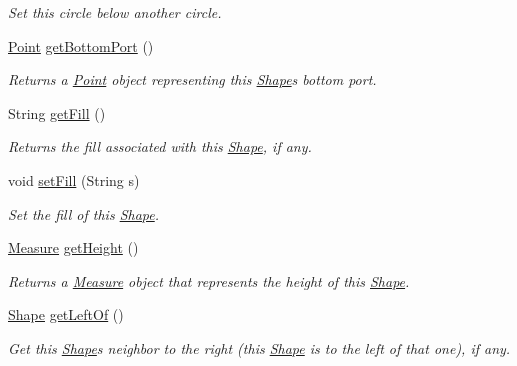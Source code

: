 \begin{DoxyCompactItemize}
\begin{DoxyCompactList}\small\item\em Set this circle below another circle. \end{DoxyCompactList}\item 
\hyperlink{classcom_1_1aarrelaakso_1_1drawl_1_1_point}{Point} \hyperlink{classcom_1_1aarrelaakso_1_1drawl_1_1_shape_aba14efe9a16c0808580963c66b171082}{get\+Bottom\+Port} ()
\begin{DoxyCompactList}\small\item\em Returns a \hyperlink{classcom_1_1aarrelaakso_1_1drawl_1_1_point}{Point} object representing this \hyperlink{classcom_1_1aarrelaakso_1_1drawl_1_1_shape}{Shape}\textquotesingle{}s bottom port. \end{DoxyCompactList}\item 
String \hyperlink{classcom_1_1aarrelaakso_1_1drawl_1_1_shape_a0d9a33a3e151aaceeec140bea343a650}{get\+Fill} ()
\begin{DoxyCompactList}\small\item\em Returns the fill associated with this \hyperlink{classcom_1_1aarrelaakso_1_1drawl_1_1_shape}{Shape}, if any. \end{DoxyCompactList}\item 
void \hyperlink{classcom_1_1aarrelaakso_1_1drawl_1_1_shape_a2a2868c85bfbf4d2940d929950001b3d}{set\+Fill} (String s)
\begin{DoxyCompactList}\small\item\em Set the fill of this \hyperlink{classcom_1_1aarrelaakso_1_1drawl_1_1_shape}{Shape}. \end{DoxyCompactList}\item 
\hyperlink{classcom_1_1aarrelaakso_1_1drawl_1_1_measure}{Measure} \hyperlink{classcom_1_1aarrelaakso_1_1drawl_1_1_shape_ac9f74d31c332aab76b329edc22080e67}{get\+Height} ()
\begin{DoxyCompactList}\small\item\em Returns a \hyperlink{classcom_1_1aarrelaakso_1_1drawl_1_1_measure}{Measure} object that represents the height of this \hyperlink{classcom_1_1aarrelaakso_1_1drawl_1_1_shape}{Shape}. \end{DoxyCompactList}\item 
\hyperlink{classcom_1_1aarrelaakso_1_1drawl_1_1_shape}{Shape} \hyperlink{classcom_1_1aarrelaakso_1_1drawl_1_1_shape_a2b19d5964ac46d545a7bae3133df6532}{get\+Left\+Of} ()
\begin{DoxyCompactList}\small\item\em Get this \hyperlink{classcom_1_1aarrelaakso_1_1drawl_1_1_shape}{Shape}\textquotesingle{}s neighbor to the right (this \hyperlink{classcom_1_1aarrelaakso_1_1drawl_1_1_shape}{Shape} is to the left of that one), if any. \end{DoxyCompactList}\item 

\end{DoxyCompactItemize}
